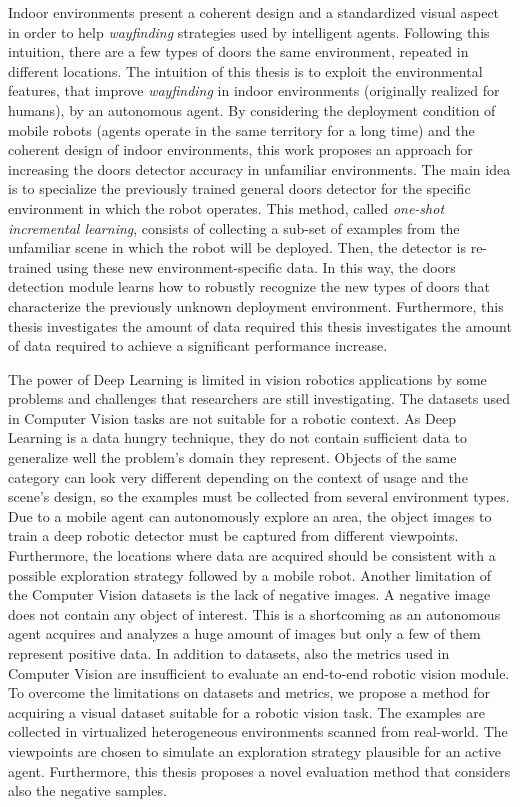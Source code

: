 Indoor environments present a coherent design and a standardized visual aspect in order to help \textit{wayfinding} strategies used by intelligent agents. Following this intuition, there are a few types of doors  the same environment, repeated in different locations. The intuition of this thesis is to exploit the environmental features, that improve \textit{wayfinding} in indoor environments (originally realized for humans), by an autonomous agent. By considering the deployment condition of mobile robots (agents operate in the same territory for a long time) and the coherent design of indoor environments, this work proposes an approach for increasing the doors detector accuracy in unfamiliar environments. The main idea is to specialize the previously trained general doors detector for the specific environment in which the robot operates. This method, called \textit{one-shot incremental learning}, consists of collecting a sub-set of examples from the unfamiliar scene in which the robot will be deployed. Then, the detector is re-trained using these new environment-specific data. In this way, the doors detection module learns how to robustly recognize the new types of doors that characterize the previously unknown deployment environment. Furthermore, this thesis investigates the amount of data required this thesis investigates the amount of data required to achieve a significant performance increase.

The power of Deep Learning is limited in vision robotics applications by some problems and challenges that researchers are still investigating. The datasets used in Computer Vision tasks are not suitable for a robotic context. As Deep Learning is a data hungry technique, they do not contain sufficient data to generalize well the problem's domain they represent. Objects of the same category can look very different depending on the context of usage and the scene's design, so the examples must be collected from several environment types. Due to a mobile agent can autonomously explore an area, the object images to train a deep robotic detector must be captured from different viewpoints. Furthermore, the locations where data are acquired should be consistent with a possible exploration strategy followed by a mobile robot. Another limitation of the Computer Vision datasets is the lack of negative images. A negative image does not contain any object of interest. This is a shortcoming as an autonomous agent acquires and analyzes a huge amount of images but only a few of them represent positive data. In addition to datasets, also the metrics used in Computer Vision are insufficient to evaluate an end-to-end robotic vision module. To overcome the limitations on datasets and metrics, we propose a method for acquiring a visual dataset suitable for a robotic vision task. The examples are collected in virtualized heterogeneous environments scanned from real-world. The viewpoints are chosen to simulate an exploration strategy plausible for an active agent. Furthermore, this thesis proposes a novel evaluation method that considers also the negative samples.

